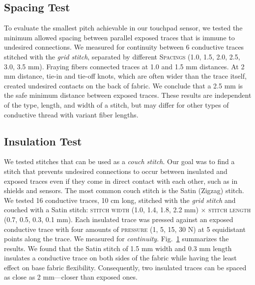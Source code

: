 \documentclass[header.tex]{subfiles}
\begin{document}
\subsection{Spacing Test} 
To evaluate the smallest pitch achievable in our touchpad sensor, we tested the minimum allowed spacing between parallel exposed traces that is immune to undesired connections. We measured for continuity between 6 conductive traces stitched with the \textit{grid stitch}, separated by different \textsc{Spacings} (1.0, 1.5, 2.0, 2.5, 3.0, 3.5 mm). Fraying fibers connected traces at 1.0 and 1.5 mm distances. At 2 mm distance, tie-in and tie-off knots, which are often wider than the trace itself, created undesired contacts on the back of fabric. We conclude that a 2.5 mm is the safe minimum distance between exposed traces. These results are independent of the type, length, and width of a stitch, but may differ for other types of conductive thread with variant fiber lengths. 

\subsection{Insulation Test}
We tested stitches that can be used as a \textit{couch stitch}. Our goal was to find a stitch that prevents undesired connections to occur between insulated and exposed traces even if they come in direct contact with each other, such as in shields and sensors. The most common couch stitch is the Satin (Zigzag) stitch. 
 We tested 16 conductive traces, 10 cm long, stitched with the \textit{grid stitch} and couched with a Satin stitch: \textsc{stitch width} (1.0, 1.4, 1.8, 2.2 mm) $\times$ \textsc{stitch length} (0.7, 0.5, 0.3, 0.1 mm). Each insulated trace was pressed against an exposed conductive trace with four amounts of \textsc{pressure} (1, 5, 15, 30 N) at 5 equidistant points along the trace. We measured for \textit{continuity}. Fig.\ \ref{fig:Insulation} summarizes the results. We found that the Satin stitch of 1.5 mm width and 0.3 mm length insulates a conductive trace on both sides of the fabric while having the least effect on base fabric flexibility. Consequently, two insulated traces can be spaced as close as 2 mm---closer than exposed ones.


\begin{figure}
    \centering
    \resizebox{0.49\textwidth}{!}{
        
    }
    \caption{}
    \label{fig:Insulation}
    \vspace{-1.5em}
\end{figure}
\end{document}
